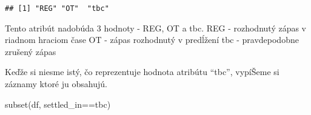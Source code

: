 \documentclass[
]{article}
\newenvironment{Shaded}{\begin{snugshade}}{\end{snugshade}}
\newcommand{\FunctionTok}[1]{\textcolor[rgb]{0.00,0.00,0.00}{#1}}
\newcommand{\NormalTok}[1]{#1}
\newcommand{\SpecialCharTok}[1]{\textcolor[rgb]{0.00,0.00,0.00}{#1}}
\newcommand{\StringTok}[1]{\textcolor[rgb]{0.31,0.60,0.02}{#1}}
\begin{document}
\begin{Shaded}
\end{Shaded}

\begin{verbatim}
## [1] "REG" "OT"  "tbc"
\end{verbatim}

Tento atribút nadobúda 3 hodnoty - REG, OT a tbc. REG - rozhodnutý zápas
v riadnom hraciom čase OT - zápas rozhodnutý v predĺžení tbc -
pravdepodobne zrušený zápas

Keďže si niesme istý, čo reprezentuje hodnota atribútu ``tbc'', vypíŠeme
si záznamy ktoré ju obsahujú.

\begin{Shaded}
\begin{Highlighting}[]
\FunctionTok{subset}\NormalTok{(df, settled\_in}\SpecialCharTok{==}\StringTok{\textquotesingle{}tbc\textquotesingle{}}\NormalTok{)}
\end{Highlighting}
\end{Shaded}
\end{document}
